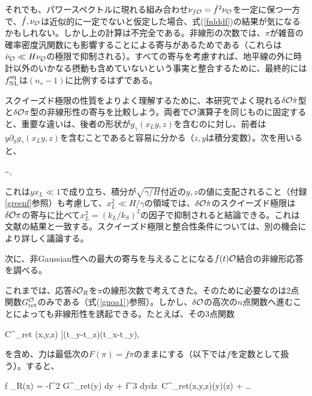 それでも、パワースペクトルに現れる組み合わせ$\nu_{f{\cal O}}=\dot f^2\nu_{{\cal O}}$を一定に保つ一方で、$\dot f,\nu_{{\cal O}}$は近似的に一定でないと仮定した場合、式(\ref{fnlddf})の結果が気になるかもしれない。しかし上の計算は不完全である。非線形の次数では、$\pi$が雑音の確率密度汎関数にも影響することによる寄与があるためである（これらは$\dot\nu_{{\cal O}}\ll H\nu_{{\cal O}}$の極限で抑制される）。すべての寄与を考慮すれば、地平線の外に時計以外のいかなる摂動も含めていないという事実と整合するために、最終的には$f_{\rm NL}^{\rm sq}$は$(n_s-1)$に比例するはずである\cite{consist,Cheung:2007sv}。

スクイーズド極限の性質をよりよく理解するために、本研究でよく現れる$\delta{\cal O}\dot\pi$型と$\delta{\cal O}\pi$型の非線形性の寄与を比較しよう。両者で${\cal O}$演算子を同じものに固定すると、重要な違いは、後者の形状が$g_\gamma(x_Ly,z)$を含むのに対し、前者は$y\partial_yg_\gamma(x_Ly,z)$を含むことであると容易に分かる（$z,y$は積分変数）。次を用いると、

\beq
{}\sim {},
\eeq

これは$yx_L\ll1$で成り立ち、積分が$\sqrt{\gamma/H}$付近の$y,z$の値に支配されること（付録\ref{greenf}参照）も考慮して、$x_L^2\ll H/\gamma$の領域では、$\delta{\cal O}\dot\pi$のスクイーズド極限は$\delta{\cal O}\pi$の寄与に比べて$x_L^2=(k_L/k_S)^2$の因子で抑制されると結論できる。これは文献\cite{creminelli11}の結果と一致する。スクイーズド極限と整合性条件については、別の機会により詳しく議論する。

次に、非Gaussian性への最大の寄与を与えることになる$f(t){\cal O}$結合の非線形応答を調べる。

\label{nonlrep}

これまでは、応答$\delta{\cal O}_R$を$\pi$の線形次数で考えてきた。そのために必要なのは2点関数$G_{\rm ret}^{{\cal O}}$のみである（式(\ref{gnoa1})参照）。しかし、$\delta{\cal O}$の高次の$n$点関数へ進むことによっても非線形性を誘起できる。たとえば、その3点関数

\beq
C^{\calo}_{\rm ret} (x,y,z) \equiv \langle [\delta\calo(z),[\delta\calo(y),\delta\calo(x)]]\rangle \theta(t_y-t_z)\theta(t_x-t_y),
\eeq

を含め、力は最低次の$F(\pi)=\dot f\pi$のままにする（以下では$\dot f$を定数として扱う）。すると、

\beq
\label{calo12}
\dot f \delta\calo_R(x) = -\dot f^2 \int G^\calo_{\rm ret}\pi(y) dy + \dot f^3 \int dydz~C^{\calo}_{\rm ret}(x,y,z)\pi(y)\pi(z) + \ldots
\eeq

